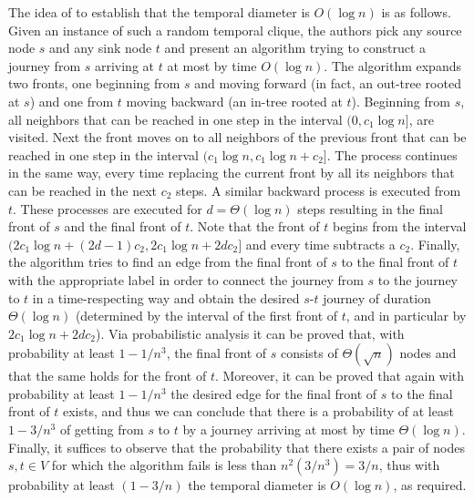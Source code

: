 \documentclass[oribibl, 11pt]{llncs}
\begin{document}
The idea of \cite{AGMS14} to establish that the temporal diameter is $O(\log n)$ is as follows. Given an instance of such a random temporal clique, the authors pick any source node $s$ and any sink node $t$ and present an algorithm trying to construct a journey from $s$ arriving at $t$ at most by time $O(\log n)$. The algorithm expands two fronts, one beginning from $s$ and moving forward (in fact, an out-tree rooted at $s$) and one from $t$ moving backward (an in-tree rooted at $t$). Beginning from $s$, all neighbors that can be reached in one step in the interval $(0,c_1\log n]$, are visited. Next the front moves on to all neighbors of the previous front that can be reached in one step in the interval $(c_1\log n,c_1\log n +c_2]$. The process continues in the same way, every time replacing the current front by all its neighbors that can be reached in the next $c_2$ steps. A similar backward process is executed from $t$. These processes are executed for $d=\Theta(\log n)$ steps resulting in the final front of $s$ and the final front of $t$. Note that the front of $t$ begins from the interval $(2c_1\log n+(2d-1)c_2,2c_1\log n+2dc_2]$ and every time subtracts a $c_2$. Finally, the algorithm tries to find an edge from the final front of $s$ to the final front of $t$ with the appropriate label in order to connect the journey from $s$ to the journey to $t$ in a time-respecting way and obtain the desired $s$-$t$ journey of duration $\Theta(\log n)$ (determined by the interval of the first front of $t$, and in particular by $2c_1\log n+2dc_2$). Via probabilistic analysis it can be proved that, with probability at least $1-1/n^3$, the final front of $s$ consists of $\Theta(\sqrt{n})$ nodes and that the same holds for the front of $t$. Moreover, it can be proved that again with probability at least $1-1/n^3$ the desired edge for the final front of $s$ to the final front of $t$ exists, and thus we can conclude that there is a probability of at least $1-3/n^3$ of getting from $s$ to $t$ by a journey arriving at most by time $\Theta(\log n)$. Finally, it suffices to observe that the probability that there exists a pair of nodes $s,t\in V$ for which the algorithm fails is less than $n^2(3/n^3)=3/n$, thus with probability at least $(1-3/n)$ the temporal diameter is $O(\log n)$, as required.
\end{document}
